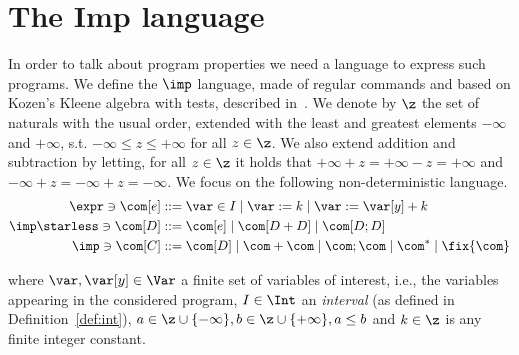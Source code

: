 \section{The Imp language}

In order to talk about program properties we need a language to
express such programs. We define the \(\imp\) language, made of
regular commands and based on Kozen’s Kleene algebra with tests,
described in~\cite{kozen1997kleene}.  We denote by \(\z\) the set of
naturals with the usual order, extended with the least and greatest
elements \(-\infty\) and \(+\infty\), s.t.
\(-\infty \leq z \leq +\infty\) for all \(z \in \z\). We also extend
addition and subtraction by letting, for all \(z \in \z\) it holds
that \(+\infty + z = + \infty - z = + \infty\) and
\(-\infty + z = -\infty + z = -\infty\).  We focus on the following
non-deterministic language.
\begin{align*}
  \expr \ni \com[e] ::= & \; \var \in I %
                          \mid \var := k \mid \var := \var[y] + k %
  \\
  \imp\starless \ni \com[D] ::= & \; \com[e] \mid \com[D + D] \mid \com[D ; D] \\
  \imp \ni \com[C] ::= & \; \com[D] \mid \com + \com \mid \com ; \com \mid \com^* \mid \fix{\com}
\end{align*}

where \(\var, \var[y] \in \Var\) a finite set of variables of
interest, i.e., the variables appearing in the considered program,
\(I\in\Int\) an \emph{interval} (as defined in
Definition~\ref{def:int}),
\({a \in \z \cup \{-\infty\}}, {b \in \z \cup\{+\infty\}}, {a\leq b}\)
and \({k \in \z}\) is any finite integer constant.
